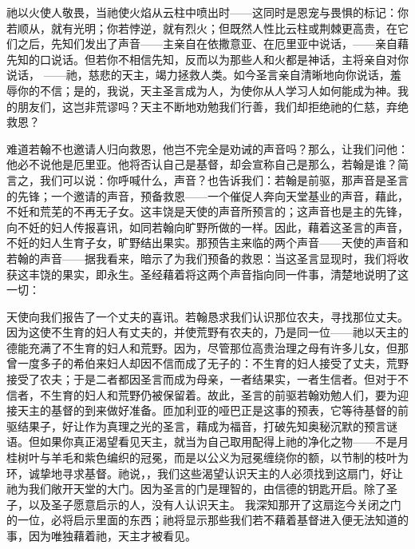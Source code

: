 祂以火使人敬畏，当祂使火焰从云柱中喷出时——这同时是恩宠与畏惧的标记：你若顺从，就有光明；你若悖逆，就有烈火；但既然人性比云柱或荆棘更高贵，在它们之后，先知们发出了声音——主亲自在依撒意亚、在厄里亚中说话，——亲自藉先知的口说话。但若你不相信先知，反而以为那些人和火都是神话，主将亲自对你说话， ——祂，慈悲的天主，竭力拯救人类。如今圣言亲自清晰地向你说话，羞辱你的不信；是的，我说，天主圣言成为人，为使你从人学习人如何能成为神。我的朋友们，这岂非荒谬吗？天主不断地劝勉我们行善，我们却拒绝祂的仁慈，弃绝救恩？\par

难道若翰不也邀请人归向救恩，他岂不完全是劝诫的声音吗？那么，让我们问他：他必不说他是厄里亚。他将否认自己是基督，却会宣称自己是那么，若翰是谁？简言之，我们可以说：你呼喊什么，声音？也告诉我们：若翰是前驱，那声音是圣言的先锋；一个邀请的声音，预备救恩——一个催促人奔向天堂基业的声音，藉此，不妊和荒芜的不再无子女。这丰饶是天使的声音所预言的；这声音也是主的先锋，向不妊的妇人传报喜讯，如同若翰向旷野所做的一样。因此，藉着这圣言的声音，不妊的妇人生育子女，旷野结出果实。那预告主来临的两个声音——天使的声音和若翰的声音——据我看来，暗示了为我们预备的救恩：当这圣言显现时，我们将收获这丰饶的果实，即永生。圣经藉着将这两个声音指向同一件事，清楚地说明了这一切：\par

天使向我们报告了一个丈夫的喜讯。若翰恳求我们认识那位农夫，寻找那位丈夫。因为这使不生育的妇人有丈夫的，并使荒野有农夫的，乃是同一位——祂以天主的德能充满了不生育的妇人和荒野。因为，尽管那位高贵治理之母有许多儿女，但那曾一度多子的希伯来妇人却因不信而成了无子的：不生育的妇人接受了丈夫，荒野接受了农夫；于是二者都因圣言而成为母亲，一者结果实，一者生信者。但对于不信者，不生育的妇人和荒野仍被保留着。故此，圣言的前驱若翰劝勉人们，要为迎接天主的基督的到来做好准备。匝加利亚的哑巴正是这事的预表，它等待基督的前驱结果子，好让作为真理之光的圣言，藉成为福音，打破先知奥秘沉默的预言谜语。但如果你真正渴望看见天主，就当为自己取用配得上祂的净化之物——不是月桂树叶与羊毛和紫色编织的冠冕，而是以公义为冠冕缠绕你的额，以节制的枝叶为环，诚挚地寻求基督。祂说，，我们这些渴望认识天主的人必须找到这扇门，好让祂为我们敞开天堂的大门。因为圣言的门是理智的，由信德的钥匙开启。除了圣子，以及圣子愿意启示的人，没有人认识天主。 我深知那开了这扇迄今关闭之门的一位，必将启示里面的东西；祂将显示那些我们若不藉着基督进入便无法知道的事，因为唯独藉着祂，天主才被看见。\par

